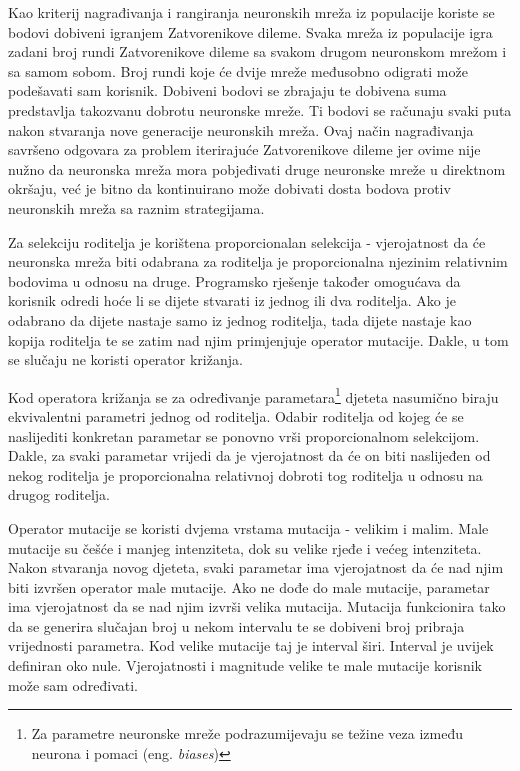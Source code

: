 \documentclass[zavrsnirad]{fer}
\begin{document}
		Kao kriterij nagrađivanja i rangiranja neuronskih mreža iz populacije koriste se bodovi dobiveni igranjem Zatvorenikove dileme. Svaka mreža iz populacije igra zadani broj rundi Zatvorenikove dileme sa svakom drugom neuronskom mrežom i sa samom sobom. Broj rundi koje će dvije mreže međusobno odigrati može podešavati sam korisnik. Dobiveni bodovi se zbrajaju te dobivena suma predstavlja takozvanu dobrotu neuronske mreže. Ti bodovi se računaju svaki puta nakon stvaranja nove generacije neuronskih mreža. Ovaj način nagrađivanja savršeno odgovara za problem iterirajuće Zatvorenikove dileme jer ovime nije nužno da neuronska mreža mora pobjeđivati druge neuronske mreže u direktnom okršaju, već je bitno da kontinuirano može dobivati dosta bodova protiv neuronskih mreža sa raznim strategijama.
		
		Za selekciju roditelja je korištena proporcionalan selekcija - vjerojatnost da će neuronska mreža biti odabrana za roditelja je proporcionalna njezinim relativnim bodovima u odnosu na druge. Programsko rješenje također omogućava da korisnik odredi hoće li se dijete stvarati iz jednog ili dva roditelja. Ako je odabrano da dijete nastaje samo iz jednog roditelja, tada dijete nastaje kao kopija roditelja te se zatim nad njim primjenjuje operator mutacije. Dakle, u tom se slučaju ne koristi operator križanja.
		
		Kod operatora križanja se za određivanje parametara\footnote{Za parametre neuronske mreže podrazumijevaju se težine veza između neurona i pomaci (eng. \textit{biases})} djeteta nasumično biraju ekvivalentni parametri jednog od roditelja. Odabir roditelja od kojeg će se naslijediti konkretan parametar se ponovno vrši proporcionalnom selekcijom. Dakle, za svaki parametar vrijedi da je vjerojatnost da će on biti naslijeđen od nekog roditelja je proporcionalna relativnoj dobroti tog roditelja u odnosu na drugog roditelja.
		
		Operator mutacije se koristi dvjema vrstama mutacija - velikim i malim. Male mutacije su češće i manjeg intenziteta, dok su velike rjeđe i većeg intenziteta. Nakon stvaranja novog djeteta, svaki parametar ima vjerojatnost da će nad njim biti izvršen operator male mutacije. Ako ne dođe do male mutacije, parametar ima vjerojatnost da se nad njim izvrši velika mutacija. Mutacija funkcionira tako da se generira slučajan broj u nekom intervalu te se dobiveni broj pribraja vrijednosti parametra. Kod velike mutacije taj je interval širi. Interval je uvijek definiran oko nule. Vjerojatnosti i magnitude velike te male mutacije korisnik može sam određivati.
		
\end{document}
